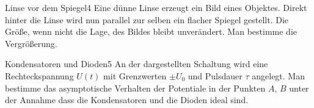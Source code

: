



\begin{problem}{Linse vor dem Spiegel}{4}
Eine dünne Linse erzeugt ein Bild eines Objektes. Direkt hinter die Linse wird nun parallel zur selben ein flacher Spiegel gestellt. Die Größe, wenn nicht die Lage, des Bildes bleibt unverändert. Man bestimme die Vergrößerung.
\end{problem}

\begin{problem}{Kondensatoren und Dioden}{5}
An der dargestellten Schaltung wird eine Rechteckspannung $U(t)$ mit Grenzwerten $\pm U_0$ und Pulsdauer $\tau$ angelegt. Man bestimme das asymptotische Verhalten der Potentiale in der Punkten $A$, $B$ unter der Annahme dass die Kondensatoren und die Dioden ideal sind.
\end{problem}

